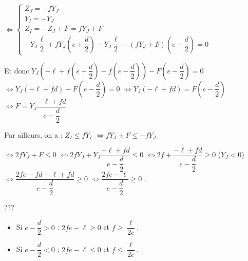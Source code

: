\documentclass[10pt,fleqn]{article} %
\begin{document}
\begin{multicols}{2}
\begin{corrige}
$
\Leftrightarrow 
\left\{
\begin{array}{l}
Z_J =  -fY_J \\
Y_I =- Y_J  \\
Z_I = -Z_J +F  = fY_J +F \\ 
-Y_J \dfrac{\ell}{2}+fY_J \left(e+\dfrac{d}{2}\right) 
-Y_J \dfrac{\ell}{2}-\left(  fY_J +F\right) \left(e-\dfrac{d}{2}\right) = 0
\end{array}
\right.$

Et donc $Y_J\left(- {\ell}+f \left(e+\dfrac{d}{2}\right) 
- f  \left(e-\dfrac{d}{2}\right)\right) 
-F \left(e-\dfrac{d}{2}\right)= 0$
$\Leftrightarrow Y_J\left(- {\ell}+f d\right) -F \left(e-\dfrac{d}{2}\right)= 0$
$\Leftrightarrow Y_J\left(- {\ell}+f d\right) =F \left(e-\dfrac{d}{2}\right)$
$\Leftrightarrow F = Y_J\dfrac{- {\ell}+f d}{e-\dfrac{d}{2}}$

Par ailleurs, on a : 
$Z_I\leq fY_I$ 
$\Leftrightarrow   fY_J +F \leq -f  Y_J$

$\Leftrightarrow   2fY_J +F \leq 0$
$\Leftrightarrow   2fY_J +Y_J\dfrac{- {\ell}+f d}{e-\dfrac{d}{2}} \leq 0$
$\Leftrightarrow   2f +\dfrac{- {\ell}+f d}{e-\dfrac{d}{2}} \geq 0$ ($Y_J<0$)
$\Leftrightarrow   \dfrac{2fe-fd- {\ell}+f d}{e-\dfrac{d}{2}} \geq 0$ 
$\Leftrightarrow   \dfrac{2fe- {\ell}}{e-\dfrac{d}{2}} \geq 0$ . 


???

\begin{itemize}
\item Si $e-\dfrac{d}{2}>0$ : ${2fe- {\ell}} \geq 0$ et  $f \geq \dfrac{{\ell}}{2e}$.
\item Si $e-\dfrac{d}{2}<0$ : ${2fe- {\ell}} \leq 0$ et  $f \leq \dfrac{{\ell}}{2e}$.
\end{itemize}
\end{corrige}



\end{multicols}
\end{document}
